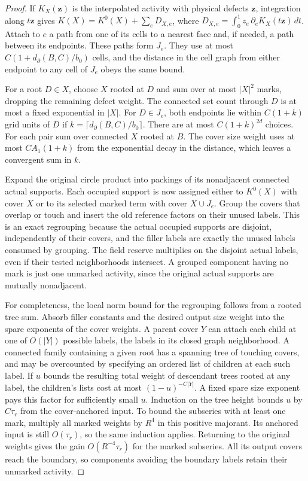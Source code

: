 \documentclass[11pt]{article}
\theoremstyle{definition}
\begin{document}
\begin{proof}
If \(K_X(\mathbf z)\) is the interpolated activity with physical
defects \(\mathbf z\), integration along \(t\mathbf z\) gives
\(K(X)=K^0(X)+\sum_e D_{X,e}\), where
\(D_{X,e}=\int_0^1 z_e\,\partial_e K_X(t\mathbf z)\,dt\).
Attach to \(e\) a path from one of its cells to a nearest face and,
if needed, a path between its endpoints. These paths form \(J_e\).
They use at most \(C(1+d_\partial(B,C)/b_0)\) cells, and the
distance in the cell graph from either endpoint to any cell of
\(J_e\) obeys the same bound.

For a root \(D\in X\), choose \(X\) rooted at \(D\) and sum over at most
\(|X|^2\) marks, dropping the remaining defect weight. The connected
set count through \(D\) is at most a fixed exponential in \(|X|\).
For \(D\in J_e\), both endpoints lie within \(C(1+k)\) grid
units of \(D\) if \(k=\lceil d_\partial(B,C)/b_0\rceil\).
There are at most \(C(1+k)^{2d}\) choices. For each pair sum over
connected \(X\) rooted at \(B\). The cover size weight uses at
most \(C A_1(1+k)\) from the exponential decay in the distance,
which leaves a convergent sum in \(k\).

Expand the original circle product into packings of its
nonadjacent connected actual supports. Each occupied support is
now assigned either to \(K^0(X)\) with cover \(X\) or to its
selected marked term with cover \(X\cup J_e\). Group the covers
that overlap or touch and insert the old reference factors on
their unused labels. This is an exact regrouping because
the actual occupied supports are disjoint, independently of
their covers, and the filler labels are exactly the unused
labels consumed by grouping. The field reserve multiplies on
the disjoint actual labels, even if their tested neighborhoods
intersect. A grouped component having no mark is just one
unmarked activity, since the original actual supports are
mutually nonadjacent.

For completeness, the local norm bound for the regrouping
follows from a rooted tree sum. Absorb filler constants and the
desired output size weight into the spare exponents of the
cover weights. A parent cover \(Y\) can attach each child at
one of \(O(|Y|)\) possible labels, the labels in its closed
graph neighborhood. A connected family containing a given
root has a spanning tree of touching covers, and may be
overcounted by specifying an ordered list of children at
each such label. If \(u\) bounds the resulting total weight
of descendant trees rooted at any label, the children's lists
cost at most \((1-u)^{-C|Y|}\). A fixed spare size exponent pays
this factor for sufficiently small \(u\). Induction on the
tree height bounds \(u\) by \(C\tau_r\) from the cover-anchored
input. To bound the subseries with at least one mark, multiply
all marked weights by \(R^4\) in this positive majorant.
Its anchored input is still \(O(\tau_r)\), so the same
induction applies. Returning to the original weights gives
the gain \(O(R^{-4}\tau_r)\) for the marked subseries.
All its output covers reach the boundary, so components avoiding
the boundary labels retain their unmarked activity.
\end{proof}
\end{document}
